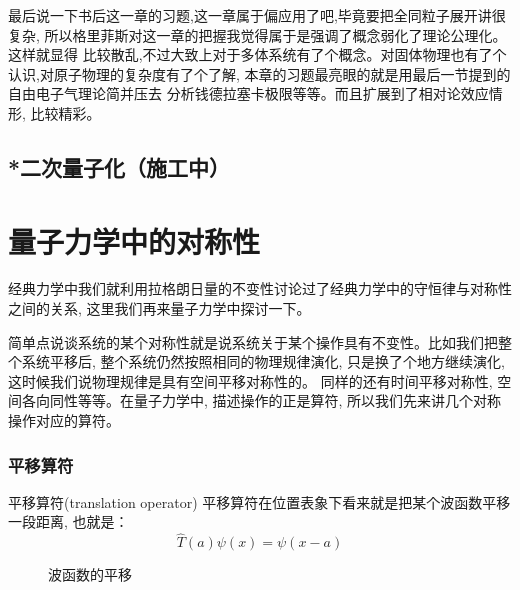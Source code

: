 \documentclass[a4paper,zihao=-4,linespread=1]{ctexrep}
\begin{document}
    最后说一下书后这一章的习题,这一章属于偏应用了吧,毕竟要把全同粒子展开讲很复杂, 所以格里菲斯对这一章的把握我觉得属于是强调了概念弱化了理论公理化。这样就显得
    比较散乱,不过大致上对于多体系统有了个概念。对固体物理也有了个认识,对原子物理的复杂度有了个了解, 本章的习题最亮眼的就是用最后一节提到的自由电子气理论简并压去
    分析钱德拉塞卡极限等等。而且扩展到了相对论效应情形, 比较精彩。
	
	\section{*二次量子化（施工中）}

    \chapter{量子力学中的对称性}
    经典力学中我们就利用拉格朗日量的不变性讨论过了经典力学中的守恒律与对称性之间的关系, 这里我们再来量子力学中探讨一下。

    简单点说谈系统的某个对称性就是说系统关于某个操作具有不变性。比如我们把整个系统平移后, 整个系统仍然按照相同的物理规律演化, 只是换了个地方继续演化, 这时候我们说物理规律是具有空间平移对称性的。
    同样的还有时间平移对称性, 空间各向同性等等。在量子力学中, 描述操作的正是算符, 所以我们先来讲几个对称操作对应的算符。
    \subsection*{平移算符}
    \begin{define}{平移算符(translation operator)}
        平移算符在位置表象下看来就是把某个波函数平移一段距离, 也就是：
        \begin{equation}
            \boxed{\hat{T}(a)\psi(x)=\psi(x-a)}
        \end{equation}
    \end{define}
    \begin{figure}[htbp]
        \centering
        \caption{波函数的平移}
    \end{figure}
\end{document}
